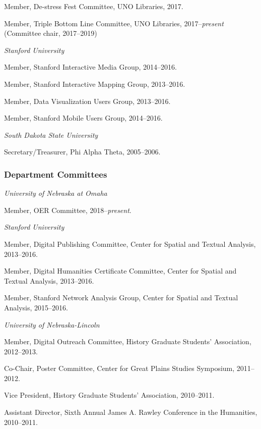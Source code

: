 Member, De-stress Fest Committee, UNO Libraries, 2017.

Member, Triple Bottom Line Committee, UNO Libraries,
2017--\emph{present} (Committee chair, 2017--2019)

\vspace{.4cm}

\emph{Stanford University}

Member, Stanford Interactive Media Group, 2014--2016.

Member, Stanford Interactive Mapping Group, 2013--2016.

Member, Data Visualization Users Group, 2013--2016.

Member, Stanford Mobile Users Group, 2014--2016.

\vspace{.4cm}

\emph{South Dakota State University}

Secretary/Treasurer, Phi Alpha Theta, 2005--2006.

\subsubsection{Department Committees}\label{department-committees}

\emph{University of Nebraska at Omaha}

Member, OER Committee, 2018--\emph{present}.

\vspace{.4cm}

\emph{Stanford University}

Member, Digital Publishing Committee, Center for Spatial and Textual
Analysis, 2013--2016.

Member, Digital Humanities Certificate Committee, Center for Spatial and
Textual Analysis, 2013--2016.

Member, Stanford Network Analysis Group, Center for Spatial and Textual
Analysis, 2015--2016.

\vspace{.4cm}

\emph{University of Nebraska-Lincoln}

Member, Digital Outreach Committee, History Graduate Students'
Association, 2012--2013.

Co-Chair, Poster Committee, Center for Great Plains Studies Symposium,
2011--2012.

Vice President, History Graduate Students' Association, 2010--2011.

Assistant Director, Sixth Annual James A. Rawley Conference in the
Humanities, 2010--2011.


